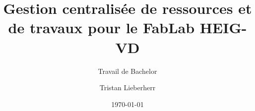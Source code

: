 \author{Tristan Lieberherr}


\title{Gestion centralisée de ressources et de travaux pour le FabLab HEIG-VD}

\subtitle{Travail de Bachelor}


\date{\today}


